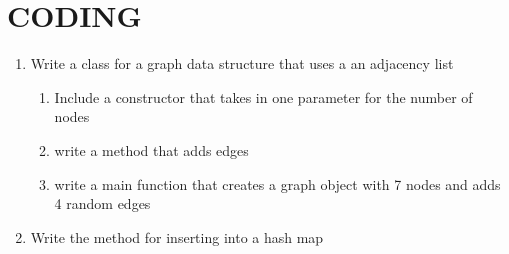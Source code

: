\documentclass[a4paper]{article}
\begin{document}
\section{CODING}
\begin{enumerate}
    \item Write a class for a graph data structure that uses a an adjacency list 
    \begin{enumerate}
        \item Include a constructor that takes in one parameter for the number of nodes
        \item write a method that adds edges
        \item write a main function that creates a graph object with 7 nodes and adds 4 random edges
    \end{enumerate}  \newpage
    \item Write the method for inserting into a hash map
\end{enumerate}
\end{document}
